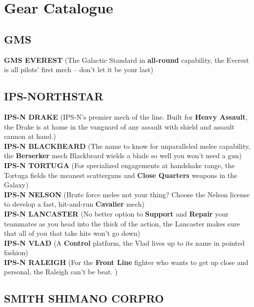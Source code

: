 \section{Gear Catalogue}

\subsection*{GMS}

\textbf{GMS EVEREST} (The Galactic Standard in \textbf{all-round} capability, the Everest is all pilots' first mech -- don't let it be your last)

\subsection*{IPS-NORTHSTAR}

\textbf{IPS-N DRAKE} (IPS-N's premier mech of the line. Built for \textbf{Heavy Assault}, the Drake is at home in the vanguard of any assault with shield and assault cannon at hand.)\\ 
\textbf{IPS-N BLACKBEARD} (The name to know for unparalleled melee capability, the \textbf{Berserker} mech Blackbeard wields a blade so well you won't need a gun)\\
\textbf{IPS-N TORTUGA} (For specialized engagements at handshake range, the Tortuga fields the meanest scatterguns and \textbf{Close Quarters} weapons in the Galaxy)\\
\textbf{IPS-N NELSON} (Brute force melee not your thing? Choose the Nelson license to develop a fast, hit-and-run \textbf{Cavalier} mech)\\
\textbf{IPS-N LANCASTER} (No better option to \textbf{Support} and \textbf{Repair} your teammates as you head into the thick of the action, the Lancaster makes sure that all of you that take hits won't go down)\\
\textbf{IPS-N VLAD} (A \textbf{Control} platform, the Vlad lives up to its name in pointed fashion)\\
\textbf{IPS-N RALEIGH} (For the \textbf{Front Line} fighter who wants to get up close and personal, the Raleigh can't be beat. )

\subsection*{SMITH SHIMANO CORPRO}

